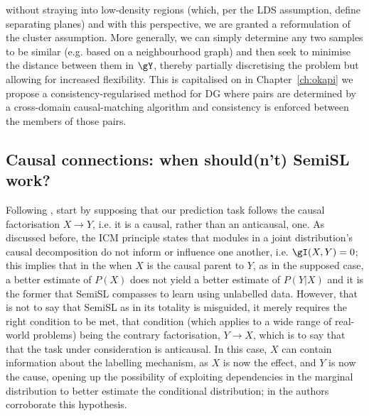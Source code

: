  \) without straying into low-density regions (which, per the LDS assumption, define separating
 planes) and with this perspective, we are granted a reformulation of the cluster assumption.
 More generally, we can simply determine any two samples to be similar (e.g. based on a
 neighbourhood graph) and then seek to minimise the distance between them in \( \gY \), thereby
 partially discretising the problem but allowing for increased flexibility.
 This is capitalised on in Chapter~\ref{ch:okapi} we propose a consistency-regularised method for
 \ac{DG} where pairs are determined by a cross-domain causal-matching algorithm and consistency is
 enforced between the members of those pairs.
 \subsection{Causal connections: when should(n't) \acs{SemiSL} work?}\label{ssec:semisl-causality}
Following \cite{scholkopf2021toward}, start by supposing that our prediction task follows the
causal factorisation \( X \to Y\), i.e. it is a causal, rather than an anticausal, one.
%
As discussed before, the ICM principle states that modules in a joint distribution's causal
decomposition do not inform or influence one another, i.e. \(\gI(X, Y) = 0 \); this implies that in
the when \(X\) is the causal parent to \(Y\), as in the supposed case, a better estimate of
\(P(X)\) does not yield a better estimate of \(P(Y|X)\) and it is the former that \ac{SemiSL}
compasses to learn using unlabelled data.
%
However, that is not to say that \ac{SemiSL} as in its totality is misguided, it merely requires the
right condition to be met, that condition (which applies to a wide range of real-world problems)
being the contrary factorisation, \(Y \to X \), which is to say that that the task under
consideration is anticausal.
%
In this case, \(X\) can contain information about the labelling mechanism, as \(X\) is now the
effect, and \(Y\) is now the cause, opening up the possibility of exploiting dependencies in the
marginal distribution to better estimate the conditional distribution; in
\cite{scholkopf2012causal} the authors corroborate this hypothesis.
%
 
